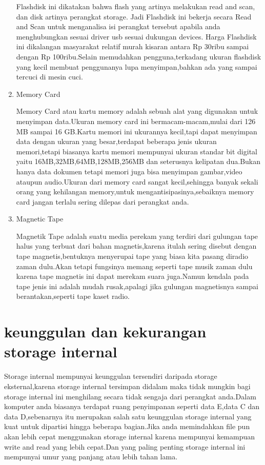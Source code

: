\begin{enumerate}
Flashdisk ini dikatakan bahwa flash yang artinya melakukan read and scan, dan disk artinya perangkat storage. Jadi Flashdisk ini bekerja secara Read and Scan untuk
menganalisa isi perangkat tersebut apabila anda menghubungkan sesuai driver usb sesuai dukungan devices. Harga Flashdisk ini dikalangan masyarakat relatif murah
kisaran antara Rp 30ribu sampai dengan Rp 100ribu.Selain memudahkan pengguna,terkadang ukuran flashdisk yang kecil membuat penggunanya lupa menyimpan,bahkan ada yang sampai tercuci di mesin cuci.

\item Memory Card

Memory Card atau kartu memory adalah sebuah alat yang digunakan untuk menyimpan data.Ukuran memory card ini bermacam-macam,mulai dari 126 MB sampai 16 GB.Kartu memori ini ukurannya kecil,tapi dapat menyimpan data dengan ukuran yang besar,terdapat beberapa jenis ukuran memori,tetapi biasanya kartu memori mempunyai ukuran standar bit digital yaitu 16MB,32MB,64MB,128MB,256MB dan seterusnya kelipatan dua.Bukan hanya data dokumen tetapi memori juga bisa menyimpan gambar,video ataupun audio.Ukuran dari memory card sangat kecil,sehingga banyak sekali orang yang kehilangan memory,untuk mengantisipasinya,sebaiknya memory card jangan terlalu sering dilepas dari perangkat anda.

\item Magnetic Tape

Magnetik Tape adalah suatu media perekam yang terdiri dari gulungan tape halus yang terbuat dari bahan magnetis,karena itulah sering disebut dengan tape magnetis,bentuknya menyerupai tape yang biasa kita pasang diradio zaman dulu.Akan tetapi fungsinya memang seperti tape musik zaman dulu karena tape magnetis ini dapat merekam suara juga.Namun kendala pada tape jenis ini adalah mudah rusak,apalagi jika gulungan magnetisnya sampai berantakan,seperti tape kaset radio.
\end{enumerate}

\section{keunggulan dan kekurangan storage internal}

Storage internal mempunyai keunggulan tersendiri daripada storage eksternal,karena storage internal tersimpan didalam maka tidak mungkin bagi storage internal ini menghilang secara tidak sengaja dari perangkat anda.Dalam komputer anda biasanya terdapat ruang penyimpanan seperti data E,data C dan data D,sebenarnya itu merupakan salah satu keunggulan storage internal yang kuat untuk dipartisi hingga beberapa bagian.Jika anda memindahkan file pun akan lebih cepat menggunakan storage internal karena mempunyai kemampuan write and read yang lebih cepat.Dan yang paling penting storage internal ini mempunyai umur yang panjang atau lebih tahan lama.

